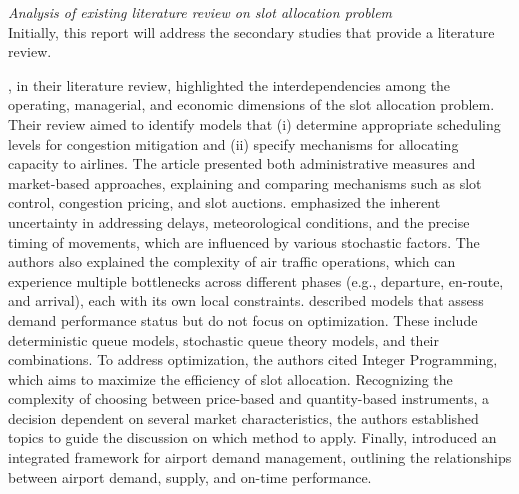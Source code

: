 %



\textit{Analysis of existing literature review on slot allocation problem}
\\

Initially, this report will address the secondary studies that provide a
literature review.

, in their literature review, highlighted the
interdependencies among the operating, managerial, and economic dimensions of
the slot allocation problem.
%
Their review aimed to identify models that (i) determine appropriate scheduling
levels for congestion mitigation and (ii) specify mechanisms for allocating
capacity to airlines.
%
The article presented both administrative measures and market-based approaches,
explaining and comparing mechanisms such as slot control, congestion pricing,
and slot auctions.
%
 emphasized the inherent uncertainty in addressing
delays, meteorological conditions, and the precise timing of movements, which
are influenced by various stochastic factors.
%
The authors also explained the complexity of air traffic operations, which can
experience multiple bottlenecks across different phases (e.g., departure,
en-route, and arrival), each with its own local constraints.
%
 described models that assess demand performance
status but do not focus on optimization.
%
These include deterministic queue models, stochastic queue theory models, and
their combinations.
%
To address optimization, the authors cited Integer Programming, which aims to
maximize the efficiency of slot allocation.
%
Recognizing the complexity of choosing between price-based and quantity-based
instruments, a decision dependent on several market characteristics, the authors
established topics to guide the discussion on which method to apply.
%
Finally,  introduced an integrated framework for
airport demand management, outlining the relationships between airport demand,
supply, and on-time performance.



